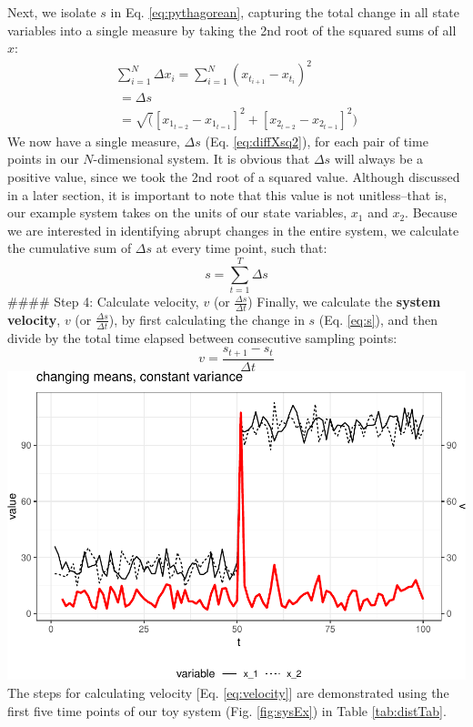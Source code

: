 \documentclass[12pt,twoside,openany]{reedthesis}
\begin{document}
Next, we isolate \(s\) in Eq. \eqref{eq:pythagorean}, capturing the total change in all state variables into a single measure by taking the 2nd root of the squared sums of all \(x\):
\begin{equation}
\begin{array}{rcr}
\sum_{i=1}^{N} \Delta {x_i} = \sum_{i=1}^{N}(x_{t_{i+1}} - x_{t_i})^2 \\ 
\ = \Delta s \\ 
\ = \sqrt([x_{1_{t=2}} - x_{1_{t=1}}]^2 + [x_{2_{t=2}} - x_{2_{t=1}}]^2)
\end{array}
\label{eq:diffXsq2}
\end{equation}
We now have a single measure, \(\Delta s\) (Eq. \eqref{eq:diffXsq2}), for each pair of time points in our \(N\)-dimensional system. It is obvious that \(\Delta s\) will always be a positive value, since we took the 2nd root of a squared value. Although discussed in a later section, it is important to note that this value is not unitless--that is, our example system takes on the units of our state variables, \(x_1\) and \(x_2\). Because we are interested in identifying abrupt changes in the entire system, we calculate the cumulative sum of \(\Delta s\) at every time point, such that:
\begin{equation}
s = \sum_{t=1}^T \Delta s
\label{eq:s}
\end{equation}
\#\#\#\# Step 4: Calculate velocity, \(v\) (or \(\frac {\Delta s}{\Delta t}\))
Finally, we calculate the \textbf{system velocity}, \(v\) (or \(\frac{\Delta s}{\Delta t}\)), by first calculating the change in \(s\) (Eq. \eqref{eq:s}), and then divide by the total time elapsed between consecutive sampling points:
\begin{equation}
 v = \frac {s_{t+1}-s_{t}}{\Delta t} 
\label{eq:velocity}
\end{equation}
\includegraphics{_myDissertation_files/figure-latex/velocSysEx1-1.pdf}
The steps for calculating velocity {[}Eq. \eqref{eq:velocity}{]} are demonstrated using the first five time points of our toy system (Fig. \ref{fig:sysEx}) in Table \ref{tab:distTab}.
\end{document}
